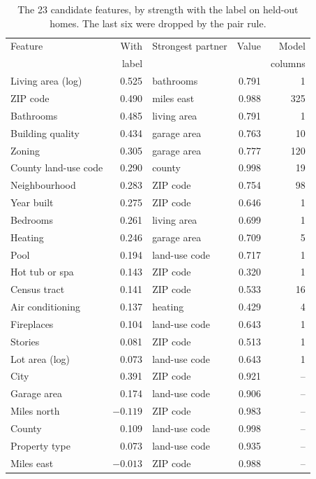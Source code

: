 \documentclass[sigconf,nonacm,10pt]{acmart}
\begin{document}
\begin{table}[h]
\caption{The 23 candidate features, by strength with the label on held-out homes. The last six were dropped by the pair rule.}
\label{tab:features}
\small
\setlength{\tabcolsep}{3pt}
\begin{tabular}{@{}lrlrr@{}}
\toprule
Feature & With & Strongest partner & Value & Model \\
 & label & & & columns \\
\midrule
Living area (log) & 0.525 & bathrooms & 0.791 & 1 \\
ZIP code & 0.490 & miles east & 0.988 & 325 \\
Bathrooms & 0.485 & living area & 0.791 & 1 \\
Building quality & 0.434 & garage area & 0.763 & 10 \\
Zoning & 0.305 & garage area & 0.777 & 120 \\
County land-use code & 0.290 & county & 0.998 & 19 \\
Neighbourhood & 0.283 & ZIP code & 0.754 & 98 \\
Year built & 0.275 & ZIP code & 0.646 & 1 \\
Bedrooms & 0.261 & living area & 0.699 & 1 \\
Heating & 0.246 & garage area & 0.709 & 5 \\
Pool & 0.194 & land-use code & 0.717 & 1 \\
Hot tub or spa & 0.143 & ZIP code & 0.320 & 1 \\
Census tract & 0.141 & ZIP code & 0.533 & 16 \\
Air conditioning & 0.137 & heating & 0.429 & 4 \\
Fireplaces & 0.104 & land-use code & 0.643 & 1 \\
Stories & 0.081 & ZIP code & 0.513 & 1 \\
Lot area (log) & 0.073 & land-use code & 0.643 & 1 \\
\midrule
City & 0.391 & ZIP code & 0.921 & -- \\
Garage area & 0.174 & land-use code & 0.906 & -- \\
Miles north & $-0.119$ & ZIP code & 0.983 & -- \\
County & 0.109 & land-use code & 0.998 & -- \\
Property type & 0.073 & land-use code & 0.935 & -- \\
Miles east & $-0.013$ & ZIP code & 0.988 & -- \\
\bottomrule
\end{tabular}
\end{table}
\end{document}
